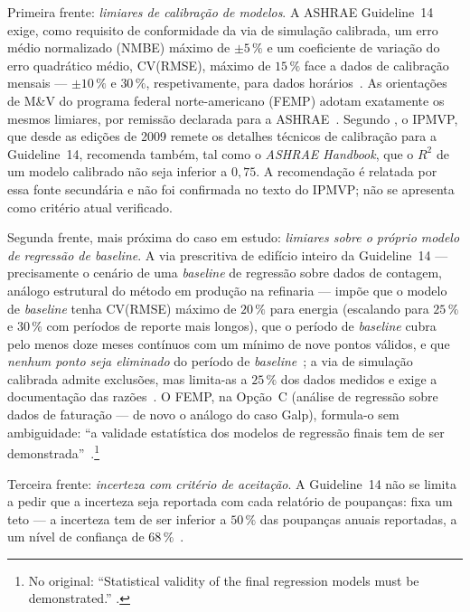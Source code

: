 Primeira frente: \emph{limiares de calibração de modelos}. A ASHRAE Guideline~14 exige, como requisito de conformidade da via de simulação calibrada, um erro médio normalizado (NMBE) máximo de $\pm 5\,\%$ e um coeficiente de variação do erro quadrático médio, CV(RMSE), máximo de $15\,\%$ face a dados de calibração mensais --- $\pm 10\,\%$ e $30\,\%$, respetivamente, para dados horários~\cite[\S4.3.2.4\,f), \S5.3.3.3.10]{ASHRAE14_2014}. As orientações de M\&V do programa federal norte-americano (FEMP) adotam exatamente os mesmos limiares, por remissão declarada para a ASHRAE~\cite[\S4.5.3.2, Tabela~4-2]{FEMP_2015}. Segundo \textcite{RuizBandera2017}, o IPMVP, que desde as edições de 2009 remete os detalhes técnicos de calibração para a Guideline~14, recomenda também, tal como o \emph{ASHRAE Handbook}, que o $R^2$ de um modelo calibrado não seja inferior a $0{,}75$. A recomendação é relatada por essa fonte secundária e não foi confirmada no texto do IPMVP; não se apresenta como critério atual verificado.

Segunda frente, mais próxima do caso em estudo: \emph{limiares sobre o próprio modelo de regressão de baseline}. A via prescritiva de edifício inteiro da Guideline~14 --- precisamente o cenário de uma \emph{baseline} de regressão sobre dados de contagem, análogo estrutural do método em produção na refinaria --- impõe que o modelo de \emph{baseline} tenha CV(RMSE) máximo de $20\,\%$ para energia (escalando para $25\,\%$ e $30\,\%$ com períodos de reporte mais longos), que o período de \emph{baseline} cubra pelo menos doze meses contínuos com um mínimo de nove pontos válidos, e que \emph{nenhum ponto seja eliminado} do período de \emph{baseline}~\cite[\S4.3.2.1]{ASHRAE14_2014}; a via de simulação calibrada admite exclusões, mas limita-as a $25\,\%$ dos dados medidos e exige a documentação das razões~\cite[\S4.3.2.4]{ASHRAE14_2014}. O FEMP, na Opção~C (análise de regressão sobre dados de faturação --- de novo o análogo do caso Galp), formula-o sem ambiguidade: \enquote{a validade estatística dos modelos de regressão finais tem de ser demonstrada}~\cite[\S4.4]{FEMP_2015}.\footnote{No original: \enquote{Statistical validity of the final regression models must be demonstrated.} \cite[\S4.4]{FEMP_2015}.}

Terceira frente: \emph{incerteza com critério de aceitação}. A Guideline~14 não se limita a pedir que a incerteza seja reportada com cada relatório de poupanças: fixa um teto --- a incerteza tem de ser inferior a $50\,\%$ das poupanças anuais reportadas, a um nível de confiança de $68\,\%$~\cite[\S4.3.2.4\,h)]{ASHRAE14_2014}.

